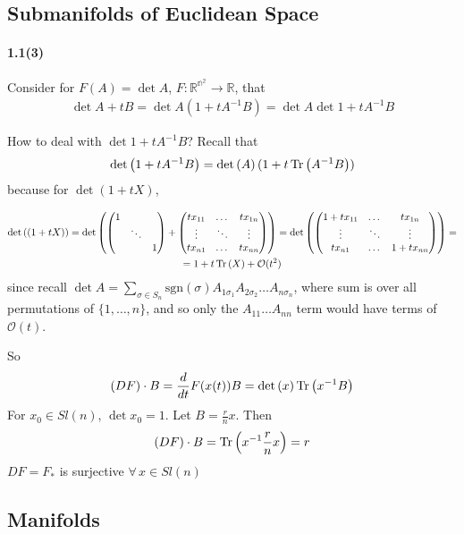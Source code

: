 
\subsection{Submanifolds of Euclidean Space}

\paragraph{1.1(3)}

Consider for $F(A) = \det{A}$, $F:\mathbb{R^{n^2}} \to \mathbb{R}$, that 
\[
\begin{gathered}
  \det{A + tB } = \det{ A ( 1 + tA^{-1} B)  } = \det{A} \det{  1 + tA^{-1}B}
\end{gathered}
\]

How to deal with $\det{1 + tA^{-1}B}$?  Recall that 
\[
\operatorname{det}\left(  1 + tA^{-1}B\right) = \operatorname{det}\left(A\right) ( 1 + t\operatorname{Tr}\left(A^{-1} B\right))
\]
because for $ \det{(1 + tX)}$, 

\[
\begin{gathered}
  \operatorname{det}\left((1+ tX)\right) = \operatorname{det}\left(  \begin{pmatrix}1& & \\ &\ddots & \\ && 1 \end{pmatrix}  +  \begin{pmatrix} t x_{11} & \dots & t x_{1n} \\ \vdots & \ddots & \vdots \\ tx_{n1} & \dots & t x_{nn} \end{pmatrix}   \right) = 
  \operatorname{det}\left(  \begin{pmatrix} 1 + tx_{11}& \dots & tx_{1n } \\ 
      \vdots & \ddots & \vdots \\ 
      tx_{n1} & \dots & 1 + tx_{nn}\end{pmatrix} \right) = \\
  = 1 + t\operatorname{Tr}\left(X\right) + \mathcal{O}(t^2)
\end{gathered}
\]
since recall $\det{A} = \sum_{\sigma \in S_n} \text{sgn}{(\sigma)} A_{1 \sigma_1} A_{2\sigma_2} \dots A_{n\sigma_n}$, where sum is over all permutations of $\lbrace 1, \dots, n \rbrace$, and so only the $A_{11}\dots A_{nn}$ term would have terms of $\mathcal{O}(t)$.  

So
\[
(DF) \cdot B = \frac{d}{dt}  F(x(t)) B = \operatorname{det}\left(x\right) \operatorname{Tr}\left(x^{-1} B\right)
\]
For $x_0 \in Sl(n)$, $\det{x_0} = 1$.  Let $B = \frac{r}{n} x$.  Then 
\[
(DF)\cdot B = \operatorname{Tr}\left(x^{-1} \frac{r}{n} x  \right) = r 
\]
$DF = F_*$ is surjective $\forall \, x \in Sl(n)$


\subsection{Manifolds}



